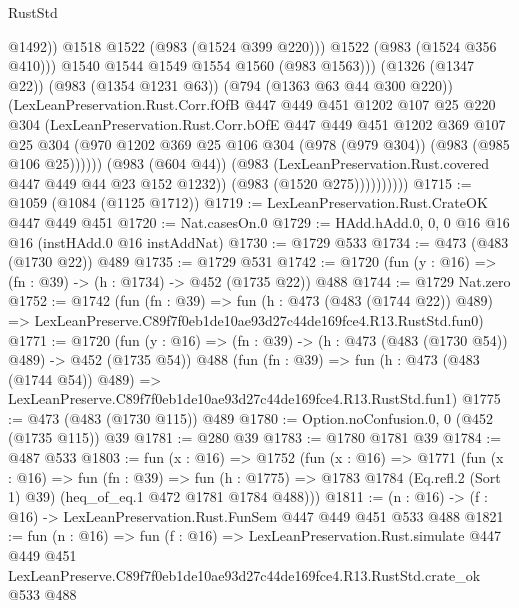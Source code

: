 \begin{lexlean}{RustStd}
\begin{coremodule}
                                  @1492))
                              @1518
                              @1522
                              (@983 (@1524 @399 @220)))
                            @1522
                            (@983 (@1524 @356 @410)))
                          @1540
                          @1544
                          @1549
                          @1554
                          @1560
                          (@983 @1563)))
                      (@1326 (@1347 @22))
                      (@983 (@1354 @1231 @63))
                      (@794 (@1363 @63 @44 @300 @220))
                      (LexLeanPreservation.Rust.Corr.fOfB
                        @447
                        @449
                        @451
                        @1202
                        @107
                        @25
                        @220
                        @304
                        (LexLeanPreservation.Rust.Corr.bOfE
                          @447
                          @449
                          @451
                          @1202
                          @369
                          @107
                          @25
                          @304
                          (@970
                            @1202
                            @369
                            @25
                            @106
                            @304
                            (@978 (@979 @304))
                            (@983 (@985 @106 @25))))))
                    (@983 (@604 @44))
                    (@983 (LexLeanPreservation.Rust.covered @447 @449 @44 @23 @152 @1232))
                    (@983 (@1520 @275))))))))))
@1715 := @1059 (@1084 (@1125 @1712))
@1719 := LexLeanPreservation.Rust.CrateOK @447 @449 @451
@1720 := Nat.casesOn.{0}
@1729 := HAdd.hAdd.{0, 0, 0} @16 @16 @16 (instHAdd.{0} @16 instAddNat)
@1730 := @1729 @533
@1734 := @473 (@483 (@1730 @22)) @489
@1735 := @1729 @531
@1742 := @1720 (fun (y : @16) => (fn : @39) -> (h : @1734) -> @452 (@1735 @22)) @488
@1744 := @1729 Nat.zero
@1752 := @1742
    (fun (fn : @39) =>
    fun (h : @473 (@483 (@1744 @22)) @489) =>
    LexLeanPreserve.C89f7f0eb1de10ae93d27c44de169fce4.R13.RustStd.fun0)
@1771 := @1720
    (fun (y : @16) => (fn : @39) -> (h : @473 (@483 (@1730 @54)) @489) -> @452 (@1735 @54))
    @488
    (fun (fn : @39) =>
    fun (h : @473 (@483 (@1744 @54)) @489) =>
    LexLeanPreserve.C89f7f0eb1de10ae93d27c44de169fce4.R13.RustStd.fun1)
@1775 := @473 (@483 (@1730 @115)) @489
@1780 := Option.noConfusion.{0, 0} (@452 (@1735 @115)) @39
@1781 := @280 @39
@1783 := @1780 @1781 @39
@1784 := @487 @533
@1803 := fun (x : @16) =>
  @1752
    (fun (x : @16) =>
    @1771
      (fun (x : @16) =>
      fun (fn : @39) =>
      fun (h : @1775) =>
      @1783 @1784 (Eq.refl.{2} (Sort 1) @39) (heq_of_eq.{1} @472 @1781 @1784 @488)))
@1811 := (n : @16) -> (f : @16) -> LexLeanPreservation.Rust.FunSem @447 @449 @451 @533 @488
@1821 := fun (n : @16) =>
  fun (f : @16) =>
  LexLeanPreservation.Rust.simulate
    @447
    @449
    @451
    LexLeanPreserve.C89f7f0eb1de10ae93d27c44de169fce4.R13.RustStd.crate_ok
    @533
    @488
\end{coremodule}
\end{lexlean}
